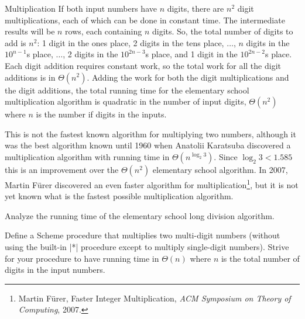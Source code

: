 \begin{schemeregion}
\begin{examplenobar}{Multiplication}
If both input numbers have $n$ digits, there are $n^2$ digit multiplications, each of which can be done in constant time.  
The intermediate results will be $n$ rows, each containing $n$ digits.  So, the total number of digits to add is $n^2$: 1 digit in the ones place, 2 digits in the tens place, $\ldots$, $n$ digits in the $10^{n-1}$s place, $\ldots$, 2 digits in the $10^{2n-3}$s place, and 1 digit in the $10^{2n-2}$s place.  Each digit addition requires constant work, so the total work for all the digit additions is in $\Theta(n^2)$.  Adding the work for both the digit multiplications and the digit additions, the total running time for the elementary school multiplication algorithm is quadratic in the number of input digits, $\Theta(n^2)$ where $n$ is the number if digits in the inputs.

This is not the fastest known algorithm for multiplying two numbers, although it was the best algorithm known until 1960 when Anatolii Karatsuba discovered a multiplication algorithm with running time in $\Theta(n^{\log_2 3})$.  Since $\log_2 3 < 1.585$ this is an improvement over the $\Theta(n^2)$ elementary school algorithm.  In 2007, Martin F\"{u}rer discovered an even faster algorithm for multiplication\footnote{Martin F\"{u}rer, Faster Integer Multiplication, \emph{ACM Symposium on Theory of Computing}, 2007.}, but it is not yet known what is the fastest possible multiplication algorithm. 
 
\end{examplenobar}

\beforeex
\begin{exercise}
\goldstar Analyze the running time of the elementary school long division algorithm.
\solution{\LATER{}}
\end{exercise}
\afterex

\beforeex
\begin{exercise}
\goldstar
Define a Scheme procedure that multiplies two multi-digit numbers (without using the built-in \scheme|*| procedure except to multiply single-digit numbers).  Strive for your procedure to have running time in $\Theta(n)$ where $n$ is the total number of digits in the input numbers.
\solution{\LATER{}}
\end{exercise}
\afterex


\end{schemeregion}
